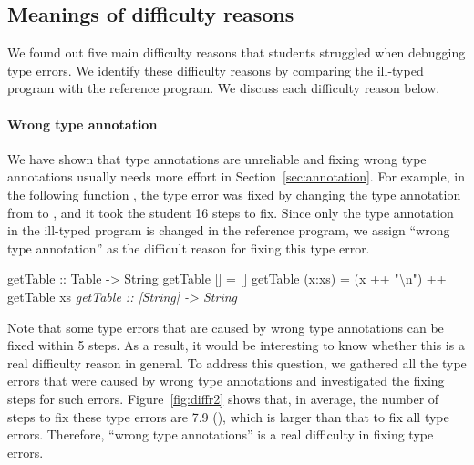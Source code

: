 \documentclass[12pt]{report}	%
\begin{document}
\subsection{Meanings of difficulty reasons}
\label{sec:diffr:reason}

We found out five main difficulty reasons
that students struggled
when debugging type errors. We identify these
difficulty reasons by comparing the ill-typed
program with the reference program. 
We discuss each difficulty reason below.

\paragraph{Wrong type annotation}
%
We have shown that type annotations are
unreliable and
fixing wrong type annotations usually
needs more effort in Section~\ref{sec:annotation}.
%
%
For example, in the following function
, the type error was fixed
by changing the type annotation from
 to
, and it
took the student 16 steps to fix. Since only the
type annotation in the ill-typed program is changed in the reference program,
we assign ``wrong type annotation'' as the difficult
reason for fixing this type error.
\begin{program}
getTable :: Table -> String
getTable [] = []
getTable (x:xs) = (x ++ "\textbackslash{n}") ++ getTable xs
\it{getTable :: [String] -> String}
\end{program}
%
%
Note that
some type errors that are caused
by wrong type annotations can be fixed within 5 steps. 
As a result, it would be interesting to 
know whether this is a real difficulty reason in general.
To address this question, we gathered all the type errors
that were caused by wrong type annotations and investigated
the fixing steps for such errors.
%
Figure~\ref{fig:diffr2} shows that, 
in average, the number of steps to fix these type errors
are 7.9 (), which is larger than that to fix
all type errors.
Therefore, ``wrong type annotations'' is a real difficulty
in fixing type errors. 
\end{document}
